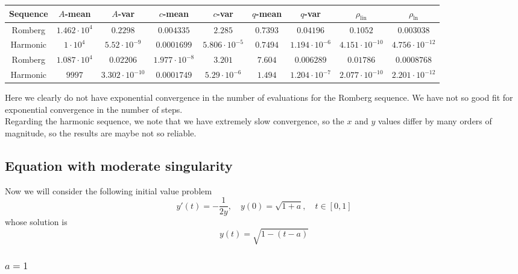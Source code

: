 \begin{table}[H]
    \centering
    \small
    \begin{tabular}{c||c|c|c|c|c|c|c|c}
Sequence & \(A\)-mean & \(A\)-var & \(c\)-mean & \(c\)-var & \(q\)-mean & \(q\)-var & \(\rho_{\operatorname{lin}}\) & \(\rho_{\ln}\)\\\hline
\rowcolor{red}
Romberg & \(1.462\cdot 10^4\) & \(0.2298\) & \(0.004335\) & \(2.285\) & \(0.7393\) & \(0.04196\) & \(0.1052\) & \(0.003038\) \\
\rowcolor{yellow}
Harmonic & \(1\cdot 10^4\) & \(5.52\cdot 10^{-9}\) & \(0.0001699\) & \(5.806\cdot 10^{-5}\) & \(0.7494\) & \(1.194\cdot 10^{-6}\) & \(4.151\cdot 10^{-10}\) & \(4.756\cdot 10^{-12}\) \\
\rowcolor{yellow}
Romberg & \(1.087\cdot 10^4\) & \(0.02206\) & \(1.977\cdot 10^{-8}\) & \(3.201\) & \(7.604\) & \(0.006289\) & \(0.01786\) & \(0.0008768\) \\
\rowcolor{yellow}
Harmonic & \(9997\) & \(3.302\cdot 10^{-10}\) & \(0.0001749\) & \(5.29\cdot 10^{-6}\) & \(1.494\) & \(1.204\cdot 10^{-7}\) & \(2.077\cdot 10^{-10}\) & \(2.201\cdot 10^{-12}\) \\
    \end{tabular}
    \label{tab:my_label}
\end{table}

Here we clearly do not have exponential convergence in the number of evaluations for the Romberg sequence. We have not so good fit for exponential convergence in the number of steps.\\

Regarding the harmonic sequence, we note that we have extremely slow convergence, so the \(x\) and \(y\) values differ by many orders of magnitude, so the results are maybe not so reliable.

\subsection{Equation with moderate singularity}

Now we will consider the following initial value problem
\begin{equation}
y'(t) = -\frac{1}{2y}, \quad y(0) = \sqrt{1+a},\quad t\in [0,1]\label{47}
\end{equation}
whose solution is 
\[
y(t) = \sqrt{1 - (t-a)}
\]

\subsubsection{\(a = 1\)}

